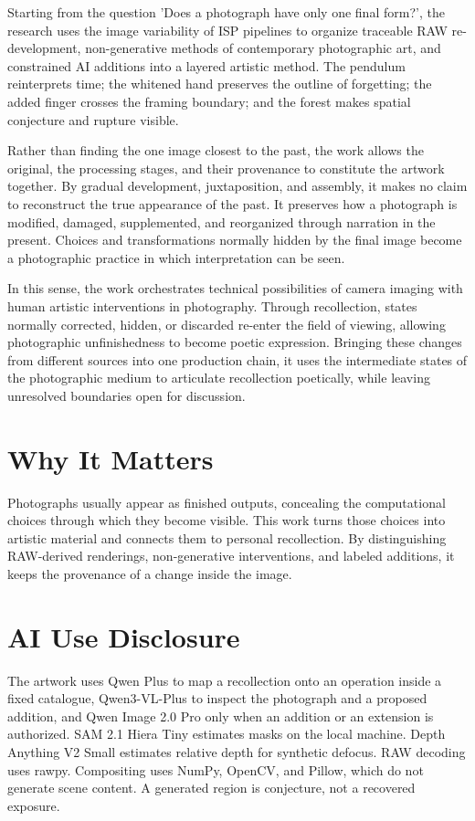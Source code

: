 \documentclass[manuscript,review,anonymous,authoryear]{acmart}
\begin{document}
Starting from the question 'Does a photograph have only one final form?', the research uses the image variability of ISP pipelines to organize traceable RAW re-development, non-generative methods of contemporary photographic art, and constrained AI additions into a layered artistic method. The pendulum reinterprets time; the whitened hand preserves the outline of forgetting; the added finger crosses the framing boundary; and the forest makes spatial conjecture and rupture visible.


Rather than finding the one image closest to the past, the work allows the original, the processing stages, and their provenance to constitute the artwork together. By gradual development, juxtaposition, and assembly, it makes no claim to reconstruct the true appearance of the past. It preserves how a photograph is modified, damaged, supplemented, and reorganized through narration in the present. Choices and transformations normally hidden by the final image become a photographic practice in which interpretation can be seen.


In this sense, the work orchestrates technical possibilities of camera imaging with human artistic interventions in photography. Through recollection, states normally corrected, hidden, or discarded re-enter the field of viewing, allowing photographic unfinishedness to become poetic expression. Bringing these changes from different sources into one production chain, it uses the intermediate states of the photographic medium to articulate recollection poetically, while leaving unresolved boundaries open for discussion.


\section*{Why It Matters}

Photographs usually appear as finished outputs, concealing the computational choices through which they become visible. This work turns those choices into artistic material and connects them to personal recollection. By distinguishing RAW-derived renderings, non-generative interventions, and labeled additions, it keeps the provenance of a change inside the image.


\section*{AI Use Disclosure}

The artwork uses Qwen Plus to map a recollection onto an operation inside a fixed catalogue, Qwen3-VL-Plus to inspect the photograph and a proposed addition, and Qwen Image 2.0 Pro only when an addition or an extension is authorized. SAM 2.1 Hiera Tiny estimates masks on the local machine. Depth Anything V2 Small estimates relative depth for synthetic defocus. RAW decoding uses rawpy. Compositing uses NumPy, OpenCV, and Pillow, which do not generate scene content. A generated region is conjecture, not a recovered exposure.
\end{document}
